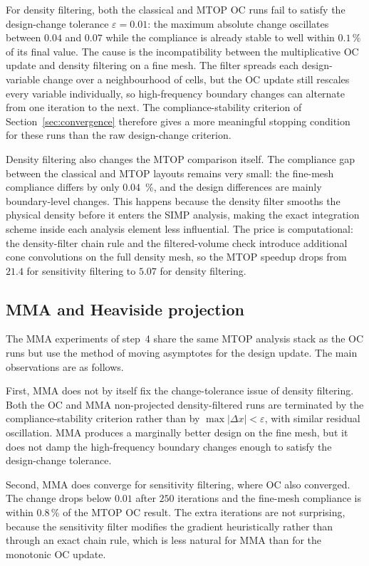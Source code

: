 \documentclass[11pt,a4paper]{article}
\begin{document}
For density filtering, both the classical and MTOP OC runs fail to satisfy the design-change tolerance $\varepsilon=0.01$: the maximum absolute change oscillates between $0.04$ and $0.07$ while the compliance is already stable to well within $0.1\,\%$ of its final value. The cause is the incompatibility between the multiplicative OC update and density filtering on a fine mesh. The filter spreads each design-variable change over a neighbourhood of cells, but the OC update still rescales every variable individually, so high-frequency boundary changes can alternate from one iteration to the next. The compliance-stability criterion of Section~\ref{sec:convergence} therefore gives a more meaningful stopping condition for these runs than the raw design-change criterion.

Density filtering also changes the MTOP comparison itself. The compliance gap between the classical and MTOP layouts remains very small: the fine-mesh compliance differs by only \SI{0.04}{\percent}, and the design differences are mainly boundary-level changes. This happens because the density filter smooths the physical density before it enters the SIMP analysis, making the exact integration scheme inside each analysis element less influential. The price is computational: the density-filter chain rule and the filtered-volume check introduce additional cone convolutions on the full density mesh, so the MTOP speedup drops from $21.4$ for sensitivity filtering to $5.07$ for density filtering.

\subsection{MMA and Heaviside projection}\label{sec:mma-vs-oc}\label{sec:eta-effect}

The MMA experiments of step~4 share the same MTOP analysis stack as the OC runs but use the method of moving asymptotes for the design update. The main observations are as follows.

First, MMA does not by itself fix the change-tolerance issue of density filtering. Both the OC and MMA non-projected density-filtered runs are terminated by the compliance-stability criterion rather than by $\max|\Delta x|<\varepsilon$, with similar residual oscillation. MMA produces a marginally better design on the fine mesh, but it does not damp the high-frequency boundary changes enough to satisfy the design-change tolerance.

Second, MMA does converge for sensitivity filtering, where OC also converged. The change drops below $0.01$ after $250$ iterations and the fine-mesh compliance is within $0.8$\,\% of the MTOP OC result. The extra iterations are not surprising, because the sensitivity filter modifies the gradient heuristically rather than through an exact chain rule, which is less natural for MMA than for the monotonic OC update.
\end{document}
